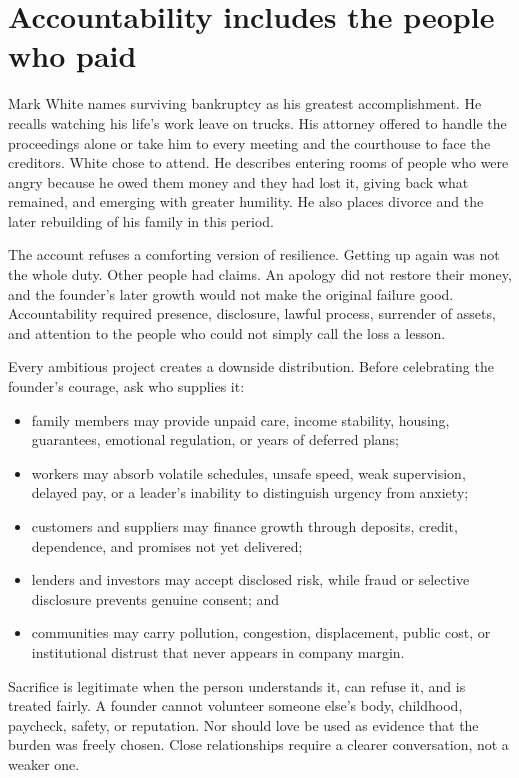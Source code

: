 \section{Accountability includes the people who paid}

Mark White names surviving bankruptcy as his greatest accomplishment. He
recalls watching his life's work leave on trucks. His attorney offered to
handle the proceedings alone or take him to every meeting and the courthouse
to face the creditors. White chose to attend. He describes entering rooms of
people who were angry because he owed them money and they had lost it, giving
back what remained, and emerging with greater humility. He also places divorce
and the later rebuilding of his family in this period.

The account refuses a comforting version of resilience. Getting up again was
not the whole duty. Other people had claims. An apology did not restore their
money, and the founder's later growth would not make the original failure good.
Accountability required presence, disclosure, lawful process, surrender of
assets, and attention to the people who could not simply call the loss a
lesson.

Every ambitious project creates a downside distribution. Before celebrating
the founder's courage, ask who supplies it:

\begin{itemize}[itemsep=0.13em]
\item family members may provide unpaid care, income stability, housing,
  guarantees, emotional regulation, or years of deferred plans;
\item workers may absorb volatile schedules, unsafe speed, weak supervision,
  delayed pay, or a leader's inability to distinguish urgency from anxiety;
\item customers and suppliers may finance growth through deposits, credit,
  dependence, and promises not yet delivered;
\item lenders and investors may accept disclosed risk, while fraud or selective
  disclosure prevents genuine consent; and
\item communities may carry pollution, congestion, displacement, public cost,
  or institutional distrust that never appears in company margin.
\end{itemize}

Sacrifice is legitimate when the person understands it, can refuse it, and is
treated fairly. A founder cannot volunteer someone else's body, childhood,
paycheck, safety, or reputation. Nor should love be used as evidence that the
burden was freely chosen. Close relationships require a clearer conversation,
not a weaker one.

